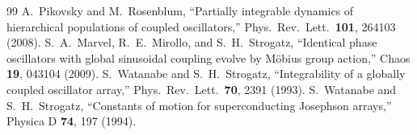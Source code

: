 \documentclass[aip,preprint,amsmath,amssymb]{revtex4-2}
\begin{document}
\begin{thebibliography}{99}
 A.~Pikovsky and M.~Rosenblum, ``Partially integrable dynamics of hierarchical populations of coupled oscillators,'' Phys.\ Rev.\ Lett.\ \textbf{101}, 264103 (2008).
 S.~A.~Marvel, R.~E.~Mirollo, and S.~H.~Strogatz, ``Identical phase oscillators with global sinusoidal coupling evolve by M\"obius group action,'' Chaos \textbf{19}, 043104 (2009).
 S.~Watanabe and S.~H.~Strogatz, ``Integrability of a globally coupled oscillator array,'' Phys.\ Rev.\ Lett.\ \textbf{70}, 2391 (1993).
 S.~Watanabe and S.~H.~Strogatz, ``Constants of motion for superconducting Josephson arrays,'' Physica D \textbf{74}, 197 (1994).
\end{thebibliography}
\end{document}
